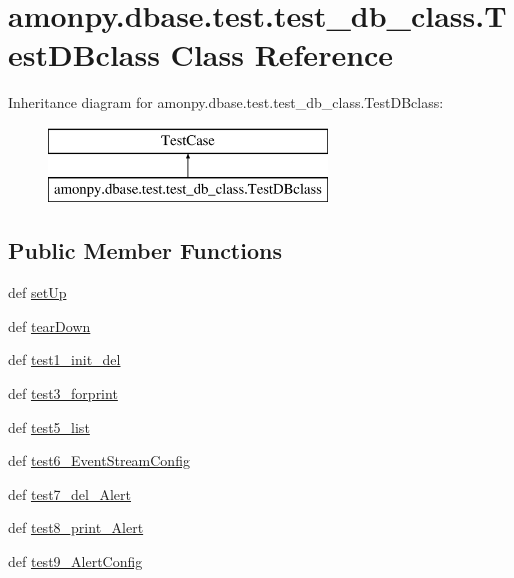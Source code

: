 \hypertarget{classamonpy_1_1dbase_1_1test_1_1test__db__class_1_1_test_d_bclass}{\section{amonpy.\-dbase.\-test.\-test\-\_\-db\-\_\-class.\-Test\-D\-Bclass Class Reference}
\label{classamonpy_1_1dbase_1_1test_1_1test__db__class_1_1_test_d_bclass}
}
Inheritance diagram for amonpy.\-dbase.\-test.\-test\-\_\-db\-\_\-class.\-Test\-D\-Bclass\-:\begin{figure}[H]
\begin{center}
\leavevmode
\includegraphics[height=2.000000cm]{classamonpy_1_1dbase_1_1test_1_1test__db__class_1_1_test_d_bclass}
\end{center}
\end{figure}
\subsection*{Public Member Functions}
\begin{DoxyCompactItemize}
\item 
def \hyperlink{classamonpy_1_1dbase_1_1test_1_1test__db__class_1_1_test_d_bclass_a31494b390c6fc80f95278686176ec5f8}{set\-Up}
\item 
def \hyperlink{classamonpy_1_1dbase_1_1test_1_1test__db__class_1_1_test_d_bclass_a88a8aa65c07160914a02c08b7a640ba5}{tear\-Down}
\item 
def \hyperlink{classamonpy_1_1dbase_1_1test_1_1test__db__class_1_1_test_d_bclass_a97be3dd99ebc1f8b14693db6915777d1}{test1\-\_\-init\-\_\-del}
\item 
def \hyperlink{classamonpy_1_1dbase_1_1test_1_1test__db__class_1_1_test_d_bclass_a6ef3d28a9cd7eed053496e50343dc739}{test3\-\_\-forprint}
\item 
def \hyperlink{classamonpy_1_1dbase_1_1test_1_1test__db__class_1_1_test_d_bclass_a6617ea3ec878545db8b3c18266b4f7b3}{test5\-\_\-list}
\item 
def \hyperlink{classamonpy_1_1dbase_1_1test_1_1test__db__class_1_1_test_d_bclass_a7f16f16b2c55311ba8574e012c28932b}{test6\-\_\-\-Event\-Stream\-Config}
\item 
def \hyperlink{classamonpy_1_1dbase_1_1test_1_1test__db__class_1_1_test_d_bclass_af08a45abf4c3d741fe633431598387e5}{test7\-\_\-del\-\_\-\-Alert}
\item 
def \hyperlink{classamonpy_1_1dbase_1_1test_1_1test__db__class_1_1_test_d_bclass_a6dbca107c4d681938a6d63b4f917d849}{test8\-\_\-print\-\_\-\-Alert}
\item 
def \hyperlink{classamonpy_1_1dbase_1_1test_1_1test__db__class_1_1_test_d_bclass_a314fdaa0e19025b59e6409e85f96ab6a}{test9\-\_\-\-Alert\-Config}
\end{DoxyCompactItemize}


